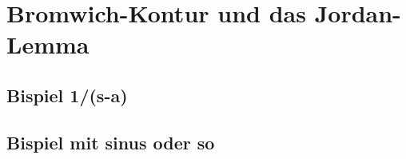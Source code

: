 %
%
%
%
\section{Bromwich-Kontur und das Jordan-Lemma  
\label{laplace:section:teil2}}


\subsection{Bispiel 1/(s-a)}
\subsection{Bispiel mit sinus oder so}
